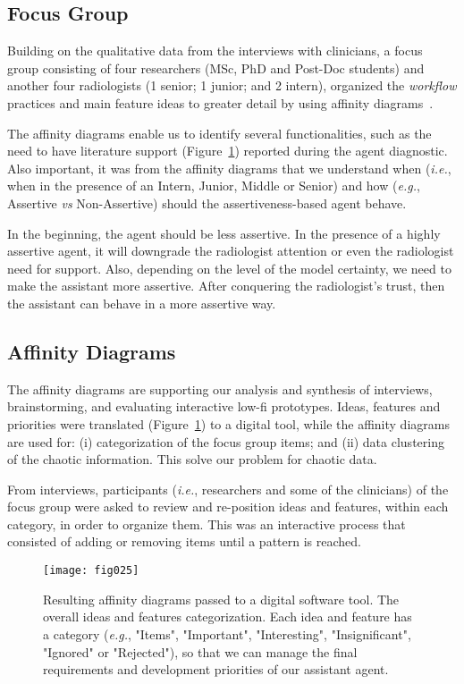 \subsection{Focus Group}
\label{sec:sec00502}

Building on the qualitative data from the interviews with clinicians, a focus group consisting of four researchers (MSc, PhD and Post-Doc students) and another four radiologists (1 senior; 1 junior; and 2 intern), organized the {\it workflow} practices and main feature ideas to greater detail by using affinity diagrams~\cite{Hoiseth:2013:RGD:2468356.2468436}.

The affinity diagrams enable us to identify several functionalities, such as the need to have literature support (Figure~\ref{fig:fig025}) reported during the agent diagnostic.
Also important, it was from the affinity diagrams that we understand when ({\it i.e.}, when in the presence of an Intern, Junior, Middle or Senior) and how ({\it e.g.}, Assertive {\it vs} Non-Assertive) should the assertiveness-based agent behave.

In the beginning, the agent should be less assertive.
In the presence of a highly assertive agent, it will downgrade the radiologist attention or even the radiologist need for support.
Also, depending on the level of the model certainty, we need to make the assistant more assertive.
After conquering the radiologist’s trust, then the assistant can behave in a more assertive way.

\subsection{Affinity Diagrams}
\label{sec:sec00503}

The affinity diagrams are supporting our analysis and synthesis of interviews, brainstorming, and evaluating interactive low-fi prototypes.
Ideas, features and priorities were translated (Figure~\ref{fig:fig025}) to a digital tool, while the affinity diagrams are used for: (i) categorization of the focus group items; and (ii) data clustering of the chaotic information.
This solve our problem for chaotic data.

From interviews, participants ({\it i.e.}, researchers and some of the clinicians) of the focus group were asked to review and re-position ideas and features, within each category, in order to organize them.
This was an interactive process that consisted of adding or removing items until a pattern is reached.

\begin{figure}[htbp]
\centering
\texttt{[image: fig025]}
\caption{Resulting affinity diagrams passed to a digital software tool. The overall ideas and features categorization. Each idea and feature has a category ({\it e.g.}, "Items", "Important", "Interesting", "Insignificant", "Ignored" or "Rejected"), so that we can manage the final requirements and development priorities of our assistant agent.}
\label{fig:fig025}
\end{figure}

